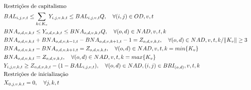 \begin{align}
	 & \text{Restrições de capitalismo}  \notag                                                                                                                                                                                                                  \\
	 & BAL_{i,j,v,t} \leq \sum_{k \in K_v}Y_{i,j,v,k,t} \leq BAL_{i,j,v,t} Q, \quad  \forall (i,j)\in OD,v,t                                                                                                          \label{eq: m1_activ_bin_sum_autho}         \\
	 & BNA_{o,d,v,k,t} \leq Y_{o,d,v,k,t} \leq BNA_{o,d,v,k,t} Q, \quad  \forall (o,d)\in NAD, v, t, k                                                                                                                \label{eq: m1_activ_bin_autho}             \\
	 & BNA_{o,d,v,k,t} + BNA_{o,d,v,k-1,t} -  BNA_{o,d,v,k+1,t} -1 = Z_{o,d,v,k,t}, \quad  \forall (o,d)\in NAD, v, t, k / \lVert K_v \rVert \geq 3                                                                   \label{eq: m1_cal_betwen_autho_val}        \\
	 & BNA_{o,d,v,k,t} -  BNA_{o,d,v,k+1,t} = Z_{o,d,v,k,t}, \quad  \forall (o,d)\in NAD, v, t, k = min\{K_v\}                                                                                                        \label{eq: m1_cal_first_autho_val}         \\
	 & BNA_{o,d,v,k,t} = Z_{o,d,v,k,t}, \quad  \forall (o,d)\in NAD, v, t, k = max\{K_v\}                                                                                                                             \label{eq: m1_cal_last_autho_val}          \\
	 & Y_{i,j,v,k,t} \geq Z_{o,d,v,k,t} - (1-BAL_{i,j,v,t}), \quad  \forall (o,d)\in NAD, (i,j) \in BRI_{(o,d)}, v,t,k                                                                                                \label{eq: m1_autho_activ_noadj}           \\%
	 & \text{Restrições de inicialização}  \notag                                                                                                                                                                                                                \\
	 & X_{0,j,v,k,t} = 0,     \quad \forall j,k,t                                                                                                                                                                     \label{eq: m1_ini_assig}                   \\

\end{align}
